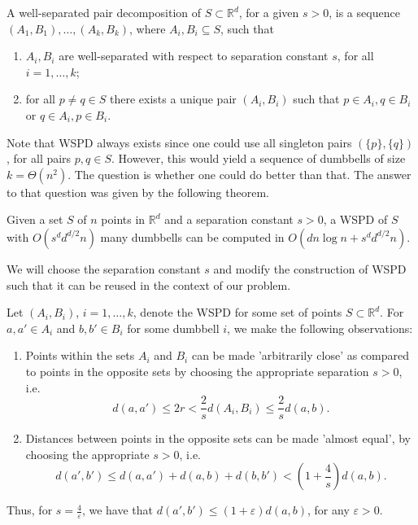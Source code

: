 \documentclass[a4paper,UKenglish,cleveref, autoref, thm-restate]{lipics-v2021}
\begin{document}
\begin{definition}[WSPD]\label{wspd:def}
A well-separated pair decomposition of $S\subset \mathbb{R}^d$, for a given $s>0$, is 
a sequence $(A_1, B_1), \ldots, (A_k, B_k)$, where $A_i, B_i\subseteq S$, such that 
\begin{enumerate}
    \item $A_i, B_i$ are well-separated with respect to separation constant $s$, for all $i=1,\ldots, k$;
    \item for all $p\neq q\in S$ there exists a unique pair $(A_i, B_i)$ such that 
    $p\in A_i, q\in B_i$ or $q\in A_i, p\in B_i$. 
\end{enumerate}
\end{definition}
Note that WSPD always exists since one could use all singleton pairs $(\{p\},\{q\})$, 
for all pairs $p, q\in S$. However, this would yield a sequence of dumbbells of size
$k = \Theta(n^2)$. The  question is whether one could do better than that. The 
answer to that question was given by the following theorem.
\begin{theorem}\label{tm:WSPD}
Given a set $S$ of $n$ points in $\mathbb{R}^d$ and a separation constant $s>0$, 
a WSPD of $S$ with $O(s^d d^{d/2}n)$ many dumbbells can be computed in 
$O(dn\log n + s^d d^{d/2}n)$.
\end{theorem}

We will choose the separation constant $s$ and modify the construction of WSPD such that it can be reused in the context 
of our problem. 

Let $(A_i, B_i)$, $i=1, \ldots, k$, denote the WSPD for some set of points $S\subset \mathbb{R}^d$. 
For $a, a' \in A_i$ and $b, b' \in B_i$ for some dumbbell $i$, we make the following observations:
\begin{enumerate}
    \item Points within the sets $A_i$ and $B_i$ can be made 'arbitrarily close' as compared to points in the opposite sets by choosing the appropriate 
    separation $s>0$, i.e. 
        \begin{equation}
            d(a, a') \le 2 r < \frac{2}{s} d(A_i, B_i) \le \frac{2}{s} d(a, b) .
        \end{equation}
    \item Distances between points in the opposite sets can be made 'almost equal', by choosing the appropriate $s>0$, i.e. 
        \begin{equation}\label{eq:wspd_guarantee}
                d(a', b') \le d(a, a') + d(a, b) + d(b, b') < (1+\frac{4}{s}) d(a, b).
        \end{equation}
\end{enumerate}
Thus, for $s = \frac{4}{\varepsilon}$, we have that $d(a', b')\le (1+\varepsilon) d(a, b)$, for any $\varepsilon>0$.
\end{document}
